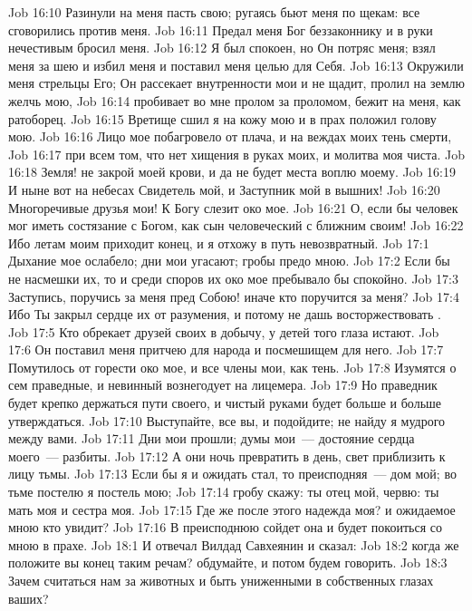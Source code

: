 \vs Job 16:10 Разинули на меня пасть свою; ругаясь бьют меня по щекам: все сговорились против меня.
\vs Job 16:11 Предал меня Бог беззаконнику и в руки нечестивым бросил меня.
\vs Job 16:12 Я был спокоен, но Он потряс меня; взял меня за шею и избил меня и поставил меня целью для Себя.
\vs Job 16:13 Окружили меня стрельцы Его; Он рассекает внутренности мои и не щадит, пролил на землю желчь мою,
\vs Job 16:14 пробивает во мне пролом за проломом, бежит на меня, как ратоборец.
\vs Job 16:15 Вретище сшил я на кожу мою и в прах положил голову мою.
\vs Job 16:16 Лицо мое побагровело от плача, и на веждах моих тень смерти,
\vs Job 16:17 при всем том, что нет хищения в руках моих, и молитва моя чиста.
\vs Job 16:18 Земля! не закрой моей крови, и да не будет места воплю моему.
\vs Job 16:19 И ныне вот на небесах Свидетель мой, и Заступник мой в вышних!
\vs Job 16:20 Многоречивые друзья мои! К Богу слезит око мое.
\vs Job 16:21 О, если бы человек мог иметь состязание с Богом, как сын человеческий с ближним своим!
\vs Job 16:22 Ибо летам моим приходит конец, и я отхожу в путь невозвратный.
\vs Job 17:1 Дыхание мое ослабело; дни мои угасают; гробы предо мною.
\vs Job 17:2 Если бы не насмешки их, то и среди споров их око мое пребывало бы спокойно.
\vs Job 17:3 Заступись, поручись  за меня пред Собою! иначе кто поручится за меня?
\vs Job 17:4 Ибо Ты закрыл сердце их от разумения, и потому не дашь восторжествовать .
\vs Job 17:5 Кто обрекает друзей своих в добычу, у детей того глаза истают.
\vs Job 17:6 Он поставил меня притчею для народа и посмешищем для него.
\vs Job 17:7 Помутилось от горести око мое, и все члены мои, как тень.
\vs Job 17:8 Изумятся о сем праведные, и невинный вознегодует на лицемера.
\vs Job 17:9 Но праведник будет крепко держаться пути своего, и чистый руками будет больше и больше утверждаться.
\vs Job 17:10 Выступайте, все вы, и подойдите; не найду я мудрого между вами.
\vs Job 17:11 Дни мои прошли; думы мои~--- достояние сердца моего~--- разбиты.
\vs Job 17:12 А они ночь  превратить в день, свет приблизить к лицу тьмы.
\vs Job 17:13 Если бы я и ожидать стал, то преисподняя~--- дом мой; во тьме постелю я постель мою;
\vs Job 17:14 гробу скажу: ты отец мой, червю: ты мать моя и сестра моя.
\vs Job 17:15 Где же после этого надежда моя? и ожидаемое мною кто увидит?
\vs Job 17:16 В преисподнюю сойдет она и будет покоиться со мною в прахе.
\vs Job 18:1 И отвечал Вилдад Савхеянин и сказал:
\vs Job 18:2 когда же положите вы конец таким речам? обдумайте, и потом будем говорить.
\vs Job 18:3 Зачем считаться нам за животных и быть униженными в собственных глазах ваших?
